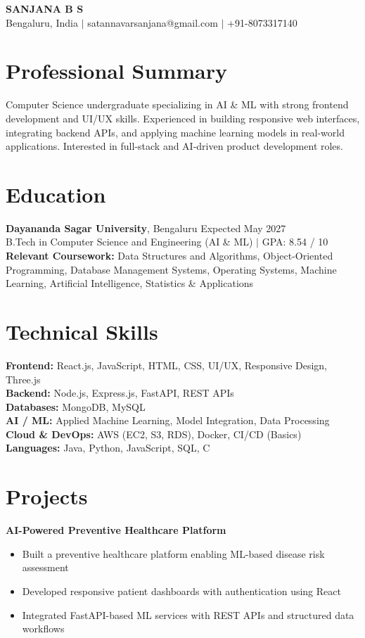 \documentclass[11pt,a4paper]{article}
\begin{document}
\begin{center}
{\LARGE \textbf{SANJANA B S}}\\[3pt]
Bengaluru, India $|$ satannavarsanjana@gmail.com $|$ +91-8073317140
\end{center}

\section*{Professional Summary}
Computer Science undergraduate specializing in AI \& ML with strong frontend development and UI/UX skills. 
Experienced in building responsive web interfaces, integrating backend APIs, and applying machine learning models in real-world applications. 
Interested in full-stack and AI-driven product development roles.

\section*{Education}
\textbf{Dayananda Sagar University}, Bengaluru \hfill Expected May 2027\\
B.Tech in Computer Science and Engineering (AI \& ML) $|$ GPA: 8.54 / 10\\
\textbf{Relevant Coursework:} Data Structures and Algorithms, Object-Oriented Programming, Database Management Systems, 
Operating Systems, Machine Learning, Artificial Intelligence, Statistics \& Applications

\section*{Technical Skills}
\textbf{Frontend:} React.js, JavaScript, HTML, CSS, UI/UX, Responsive Design, Three.js\\
\textbf{Backend:} Node.js, Express.js, FastAPI, REST APIs\\
\textbf{Databases:} MongoDB, MySQL\\
\textbf{AI / ML:} Applied Machine Learning, Model Integration, Data Processing\\
\textbf{Cloud \& DevOps:} AWS (EC2, S3, RDS), Docker, CI/CD (Basics)\\
\textbf{Languages:} Java, Python, JavaScript, SQL, C

\section*{Projects}

\textbf{AI-Powered Preventive Healthcare Platform}
\begin{itemize}
\item Built a preventive healthcare platform enabling ML-based disease risk assessment
\item Developed responsive patient dashboards with authentication using React
\item Integrated FastAPI-based ML services with REST APIs and structured data workflows
\end{itemize}
\end{document}
